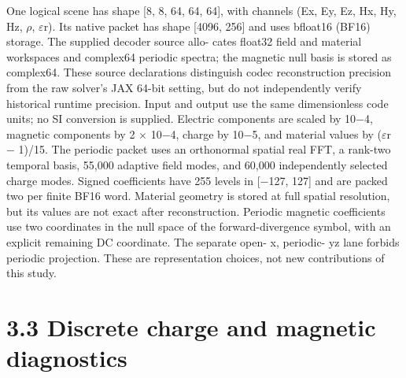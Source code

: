 \documentclass[11pt]{article}
\begin{document}
One logical scene has shape [8, 8, 64, 64, 64], with channels (Ex, Ey, Ez, Hx, Hy, Hz, \ensuremath{\rho}, \ensuremath{\varepsilon}r). Its native
packet has shape [4096, 256] and uses bfloat16 (BF16) storage. The supplied decoder source allo-
cates float32 field and material workspaces and complex64 periodic spectra; the magnetic null basis
is stored as complex64. These source declarations distinguish codec reconstruction precision from
the raw solver’s JAX 64-bit setting, but do not independently verify historical runtime precision.
Input and output use the same dimensionless code units; no SI conversion is supplied. Electric
components are scaled by 10\ensuremath{-}4, magnetic components by 2 \ensuremath{\times} 10\ensuremath{-}4, charge by 10\ensuremath{-}5, and material
values by (\ensuremath{\varepsilon}r \ensuremath{-} 1)/15.
The periodic packet uses an orthonormal spatial real FFT, a rank-two temporal basis, 55,000
adaptive field modes, and 60,000 independently selected charge modes. Signed coefficients have 255
levels in [\ensuremath{-}127, 127] and are packed two per finite BF16 word. Material geometry is stored at full
spatial resolution, but its values are not exact after reconstruction. Periodic magnetic coefficients
use two coordinates in the null space of the forward-divergence symbol, with an explicit remaining
DC coordinate. The separate open- x, periodic- yz lane forbids periodic projection. These are
representation choices, not new contributions of this study.

\section*{3.3 Discrete charge and magnetic diagnostics}
\end{document}
